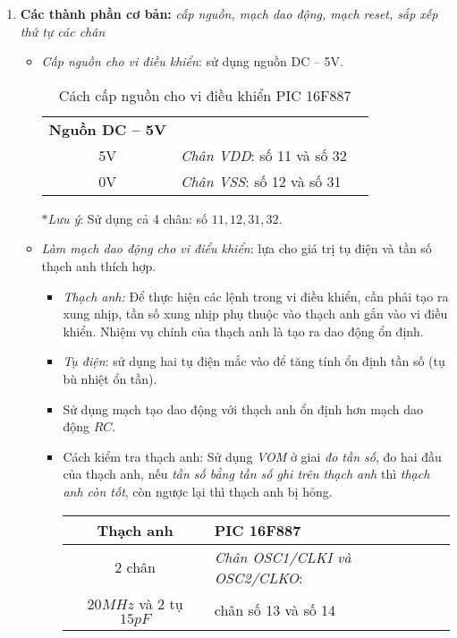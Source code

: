 \begin{enumerate}[{\bf a.}]
\item \textbf{Các thành phần cơ bản:} \textit{cấp nguồn, mạch dao động, mạch reset, sắp xếp thứ tự các chân}
\begin{itemize}
\item \textit{Cấp nguồn cho vi điều khiển}: sử dụng nguồn DC -- 5V.\\
\begin{table}[h]
\begin{center}
\begin{tabular}{|c|p{5cm}|l} \cline{1-2}
\textbf{Nguồn DC -- 5V} & \centering{\textbf{PIC 16F887}} &\\ \cline{1-2}
5V & \textit{Chân VDD}: số 11 và số 32 &\\ \cline{1-2}
0V & \textit{Chân VSS}: số 12 và số 31 &\\ \cline{1-2}
\end{tabular}
\end{center}
\caption{Cách cấp nguồn cho vi điều khiển PIC 16F887} \label{capnguon}
\end{table}
$\ast$\textit{Lưu ý}: Sử dụng cả 4 chân: số $11,12,31,32$.
\item \textit{Làm mạch dao động cho vi điểu khiển}: lựa cho giá trị tụ điện và tần số thạch anh thích hợp.
\begin{itemize}
\item \emph{Thạch anh:} Để thực hiện các lệnh trong vi điều khiển, cần phải tạo ra xung nhịp, tần số xung nhịp phụ thuộc vào thạch anh gắn vào vi điều khiển. Nhiệm vụ chính của thạch anh là tạo ra dao động ổn định.
\item \emph{Tụ điện}: sử dụng hai tụ điện mắc vào để tăng tính ổn định tần số (tụ bù nhiệt ổn tần).
\item Sử dụng mạch tạo dao động với thạch anh ổn định hơn mạch dao động $RC$.
\item Cách kiểm tra thạch anh: Sử dụng \emph{VOM} ở giai \emph{đo tần số}, đo hai đầu của thạch anh, nếu \emph{tần số bằng tần số ghi trên thạch anh} thì \emph{thạch anh còn tốt}, còn ngược lại thì thạch anh bị hỏng.
\begin{table}[h]
\begin{center}
\begin{tabular}{|c|l|} \hline
\textbf{Thạch anh} & \textbf{PIC 16F887}\\ \hline
2 chân & \textit{Chân OSC1/CLKI và OSC2/CLKO}:\\
$20MHz$ và 2 tụ $15pF$ &  chân số 13 và số 14\\ \hline

\end{tabular}
\end{center}
\end{table}
\end{itemize}
\end{itemize}
\end{enumerate}
